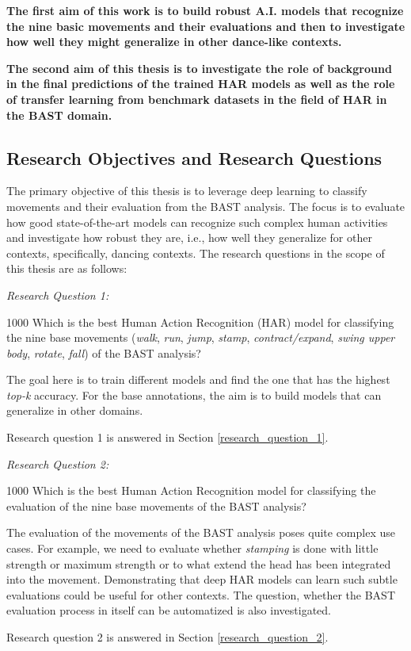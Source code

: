 \documentclass[extern,palatino]{cgMA}
\begin{document}
\bigskip
\noindent\textbf{The first aim of this work is to build robust A.I. models that recognize the nine basic movements and their evaluations and then to investigate how well they might generalize in other dance-like contexts.}

\bigskip

\noindent \textbf{The second aim of this thesis is to investigate the role of background in the final predictions of the trained HAR models as well as the role of transfer learning from benchmark datasets in the field of HAR in the BAST domain.}

\subsection{Research Objectives and Research Questions}
\label{research_objectives_and_research_questions}

The primary objective of this thesis is to leverage deep learning to classify movements and their evaluation from the BAST analysis. The focus is to evaluate how good state-of-the-art models can recognize such complex human activities and investigate how robust they are, i.e., how well they generalize for other contexts, specifically, dancing contexts. The research questions in the scope of this thesis are as follows:
\bigskip \bigskip \bigskip

\emph{Research Question 1:}
\bigskip
\begin{adjustwidth}{100}{0}
Which is the best Human Action Recognition (HAR) model for classifying the nine base movements (\textit{walk}, \textit{run}, \textit{jump}, \textit{stamp}, \textit{contract/expand}, \textit{swing upper body}, \textit{rotate}, \textit{fall}) of the BAST analysis?
    
\bigskip
\noindent The goal here is to train different models and find the one that has the highest \textit{top-k} accuracy. For the base annotations, the aim is to build models that can generalize in other domains.

\noindent Research question 1 is answered in Section \ref{research_question_1}.
\end{adjustwidth}

\bigskip \bigskip
\emph{Research Question 2:}
\bigskip
\begin{adjustwidth}{100}{0}
Which is the best Human Action Recognition model for classifying the evaluation of the nine base movements of the BAST analysis?
\bigskip

\noindent The evaluation of the movements of the BAST analysis poses quite complex use cases. For example, we need to evaluate whether \textit{stamping} is done with little strength or maximum strength or to what extend the head has been integrated into the movement. Demonstrating that deep HAR models can learn such subtle evaluations could be useful for other contexts. The question, whether the BAST evaluation process in itself can be automatized is also investigated.

\noindent Research question 2 is answered in Section \ref{research_question_2}.
\end{adjustwidth}
\end{document}
